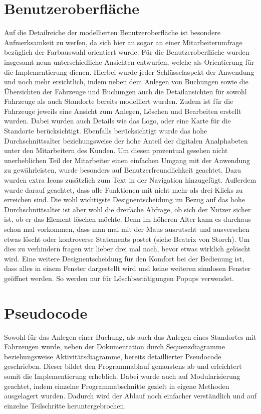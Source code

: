 \section{Benutzeroberfläche}
Auf die Detailreiche der modellierten Benutzeroberfläche ist besondere Aufmerksamkeit zu werfen, da sich hier an sogar an einer Mitarbeiterumfrage bezüglich der Farbauswahl orientiert wurde. Für die Benutzeroberfläche wurden insgesamt neun unterschiedliche Ansichten entwurfen, welche als Orientierung für die Implementierung dienen. Hierbei wurde jeder Schlüsselaspekt der Anwendung und noch mehr ersichtlich, indem neben dem Anlegen von Buchungen sowie die Übersichten der Fahrzeuge und Buchungen auch die Detailansichten für sowohl Fahrzeuge als auch Standorte bereits modelliert wurden. Zudem ist für die Fahrzeuge jeweils eine Ansicht zum Anlegen, Löschen und Bearbeiten erstellt wurden. Dabei wurden auch Details wie das Logo, oder eine Karte für die Standorte berücksichtigt. Ebenfalls berücksichtigt wurde das hohe Durchschnittsalter beziehungsweise der hohe Anteil der digitalen Analphabeten unter den Mitarbeitern des Kunden. Um diesen prozentual gesehen nicht unerheblichen Teil der Mitarbeiter einen einfachen Umgang mit der Anwendung zu gewährleisten, wurde besonders auf Benutzerfreundlichkeit geachtet. Dazu wurden extra Icons zusätzlich zum Text in der Navigation hinzugefügt. Außerdem wurde darauf geachtet, dass alle Funktionen mit nicht mehr als drei Klicks zu erreichen sind. Die wohl wichtigste Designentscheidung im Bezug auf das hohe Durchschnittsalter ist aber wohl die dreifache Abfrage, ob sich der Nutzer sicher ist, ob er das Element löschen möchte. Denn im höheren Alter kann es durchaus schon mal vorkommen, dass man mal mit der Maus ausrutscht und ausversehen etwas löscht oder kontroverse Statements postet (siehe Beatrix von Storch). Um dies zu verhindern fragen wir lieber drei mal nach, bevor etwas wirklich gelöscht wird. Eine weitere Designentscheidung für den Komfort bei der Bedienung ist, dass alles in einem Fenster dargestellt wird und keine weiteren sinnlosen Fenster geöffnet werden. So werden nur für  Löschbestätigungen Popups verwendet.

\section{Pseudocode}
Sowohl für das Anlegen einer Buchung, als auch das Anlegen eines Standortes mit Fahrzeugen wurde, neben der Dokumentation durch Sequenzdiagramme beziehungsweise Aktivitätsdiagramme, bereits detaillierter Pseudocode geschrieben. Dieser bildet den Programmablauf genaustens ab und erleichtert somit die Implementierung erheblich. Dabei wurde auch auf Modularisierung geachtet, indem einzelne Programmabschnitte gezielt in eigene Methoden ausgelagert wurden. Dadurch wird der Ablauf noch einfacher verständlich und auf einzelne Teilschritte heruntergebrochen.